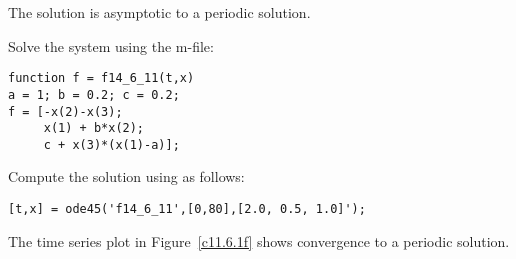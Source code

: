 \documentclass{ximera}
\begin{document}
\begin{figure}[htb]
     \centerline{%
     }
\end{figure} 

 \ans The solution is asymptotic to a periodic solution.

\soln Solve the system using the m-file:
\begin{verbatim}
function f = f14_6_11(t,x)
a = 1; b = 0.2; c = 0.2;
f = [-x(2)-x(3); 
     x(1) + b*x(2); 
     c + x(3)*(x(1)-a)];
\end{verbatim}

Compute the solution using \Matlab as follows:
\begin{verbatim}
[t,x] = ode45('f14_6_11',[0,80],[2.0, 0.5, 1.0]');
\end{verbatim}
The time series plot in Figure~\ref{c11.6.1f} shows convergence to a periodic solution.  

\begin{figure}[htb]
     \centerline{%
     }
\end{figure} 
\end{document}
